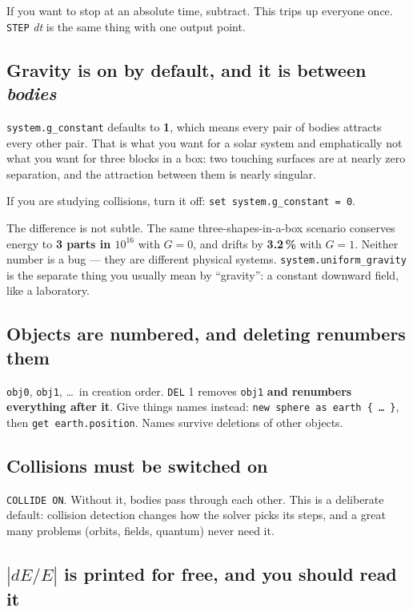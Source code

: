 \documentclass[11pt]{article}
\newcommand{\kw}[1]{\texttt{\uppercase{#1}}}
\newcommand{\code}[1]{\texttt{#1}}
\begin{document}
If you want to stop at an absolute time, subtract. This trips up
everyone once. \kw{step} \emph{dt} is the same thing with one output
point.

\subsection{Gravity is on by default, and it is between \emph{bodies}}
\label{sec:gravity}

\code{system.g\_constant} defaults to \textbf{1}, which means every pair
of bodies attracts every other pair. That is what you want for a solar
system and emphatically not what you want for three blocks in a box: two
touching surfaces are at nearly zero separation, and the attraction
between them is nearly singular.

If you are studying collisions, turn it off:
\code{set system.g\_constant = 0}.

The difference is not subtle. The same three-shapes-in-a-box scenario
conserves energy to \textbf{3 parts in $10^{16}$} with $G=0$, and drifts
by \textbf{3.2\,\%} with $G=1$. Neither number is a bug --- they are
different physical systems. \code{system.uniform\_gravity} is the
separate thing you usually mean by ``gravity'': a constant downward
field, like a laboratory.

\subsection{Objects are numbered, and deleting renumbers them}

\code{obj0}, \code{obj1}, \dots\ in creation order. \kw{del} 1 removes
\code{obj1} \textbf{and renumbers everything after it}. Give things
names instead: \code{new sphere as earth \{ \dots\ \}}, then
\code{get earth.position}. Names survive deletions of other objects.

\subsection{Collisions must be switched on}

\kw{collide on}. Without it, bodies pass through each other. This is a
deliberate default: collision detection changes how the solver picks its
steps, and a great many problems (orbits, fields, quantum) never need
it.

\subsection{$|dE/E|$ is printed for free, and you should read it}
\end{document}
